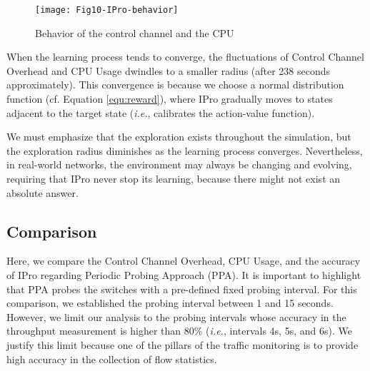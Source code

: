 \begin{figure}[h!]
    \centering
    \texttt{[image: Fig10-IPro-behavior]}
    \caption{Behavior of the control channel and the CPU}
    \label{fig:load_behavior}
\end{figure}

When the learning process tends to converge, the fluctuations of Control Channel Overhead and CPU Usage dwindles to a smaller radius (after 238 seconds approximately). This convergence is because we choose a normal distribution function (cf. Equation \ref{equ:reward}), where IPro gradually moves to states adjacent to the target state (\textit{i.e.}, calibrates the action-value function).


We must emphasize that the exploration exists throughout the simulation, but the exploration radius diminishes as the learning process converges. Nevertheless, in real-world networks, the environment may always be changing and evolving, requiring that IPro never stop its learning, because there might not exist an absolute answer.

\begin{comment}
\begin{figure}[!htp]%
    \centering
    
    \caption{CPU Usage behavior}
    \label{fig:cpu_behavior}
\end{figure}
\end{comment}

\subsection{Comparison}
\label{subsec:ipro_performance}
Here, we compare the Control Channel Overhead, CPU Usage, and the accuracy of IPro regarding Periodic Probing Approach (PPA). It is important to highlight that PPA probes the switches with a pre-defined fixed probing interval. For this comparison, we established the probing interval between 1 and 15 seconds. However, we limit our analysis to the probing intervals whose accuracy in the throughput measurement is higher than 80\% (\textit{i.e.}, intervals 4s, 5s, and 6s). We justify this limit because one of the pillars of the traffic monitoring is to provide high accuracy in the collection of flow statistics.

